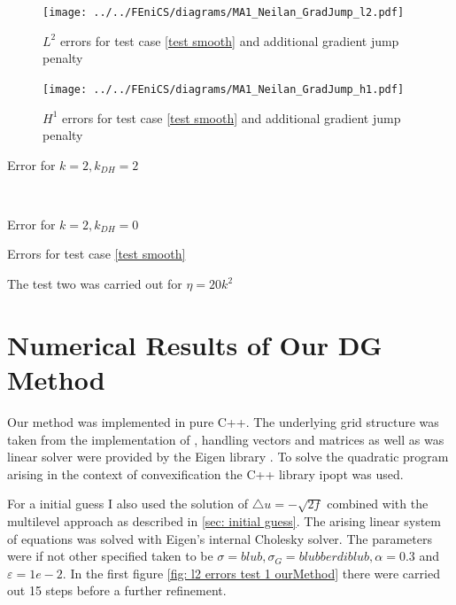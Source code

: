 \begin{figure}[h!]
	\texttt{[image: ../../FEniCS/diagrams/MA1\_Neilan\_GradJump\_l2.pdf]}
	\caption{$L^2$ errors for test case \ref{test smooth} and additional gradient jump penalty}
	\label{fig: l2 errors test 1 jump}
\end{figure}

\begin{figure}[h!]
	\texttt{[image: ../../FEniCS/diagrams/MA1\_Neilan\_GradJump\_h1.pdf]}
	\caption{$H^1$ errors for test case \ref{test smooth} and additional gradient jump penalty}
	\label{fig: h1 errors test 1 jump}
\end{figure}

\begin{table}[h]
	\begin{subtable}[b]{0.45\textwidth}
		\centering
    	\caption{Error for $k=2, k_{DH}=2$}
   \end{subtable}
   ~
	\begin{subtable}[b]{0.45\textwidth}
		\centering
	\caption{Error for $k=2, k_{DH}=0$}
	\end{subtable}
	\caption{Errors for test case \ref{test smooth}}
	\label{tab: l2 errors test 1 deg 2 jump}
\end{table}


The test two was carried out for $\eta=20k^2$


\newpage

\section{Numerical Results of Our DG Method}

Our method was implemented in pure C++. The underlying grid structure was taken from the implementation of \cite{BMV2009}, handling vectors and matrices as well as was linear solver were provided by the Eigen library \cite{eigenweb}. To solve the quadratic program arising in the context of convexification the C++ library ipopt \cite{ipopt} was used.

For a initial guess I also used the solution of $\triangle u = -\sqrt{2f}$ combined with the multilevel approach as described in \ref{sec: initial guess}.
The arising linear system of equations was solved with Eigen's internal Cholesky solver.
The parameters were if not other specified taken to be $\sigma=blub, \sigma_G = blubberdiblub, \alpha =
0.3$ and $\varepsilon = 1e-2$.
In the first figure \ref{fig: l2 errors test 1 ourMethod} there were carried out 15 steps before a further refinement.

